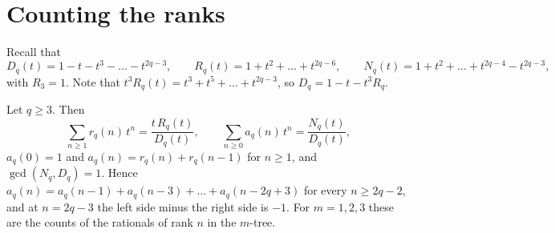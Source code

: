 \section{Counting the ranks}\label{sec:count}

Recall that
\[
D_q(t)=1-t-t^3-\dots-t^{2q-3},\qquad
R_q(t)=1+t^2+\dots+t^{2q-6},\qquad
N_q(t)=1+t^2+\dots+t^{2q-4}-t^{2q-3},
\]
with $R_3=1$. Note that $t^3R_q(t)=t^3+t^5+\dots+t^{2q-3}$, so $D_q=1-t-t^3R_q$.

\begin{theorem}[Theorem~A$_q$]\label{thm:Aq}
Let $q\ge3$. Then
\[
\sum_{n\ge1}r_q(n)\,t^n=\frac{t\,R_q(t)}{D_q(t)},\qquad \sum_{n\ge0}a_q(n)\,t^n=\frac{N_q(t)}{D_q(t)},
\]
$a_q(0)=1$ and $a_q(n)=r_q(n)+r_q(n-1)$ for $n\ge1$,
and $\gcd(N_q,D_q)=1$. Hence $a_q(n)=a_q(n-1)+a_q(n-3)+\dots+a_q(n-2q+3)$ for every $n\ge2q-2$, and at
$n=2q-3$ the left side minus the right side is $-1$. For $m=1,2,3$ these are the counts of the
rationals of rank $n$ in the $m$-tree.
\end{theorem}

